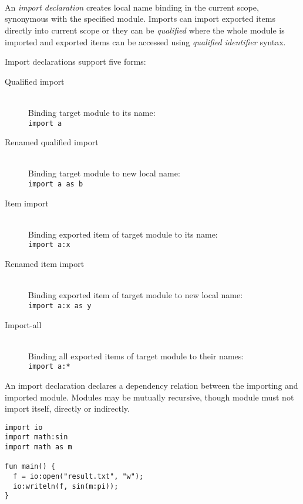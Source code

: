 \begin{bnf}
   \eq {} \  \\
  \\
   \eq    {} 
                  \gorln {} \  \  
                  \gorln {} \ \term{:} \  
                  \gorln {} \ \term{:} \  \  \  
                  \gorln {} \ \term{:} \ \term{*} 
\end{bnf}

An \emph{import declaration} creates local name binding in the current scope, synonymous with the specified module. Imports can import exported items directly into current scope or they can be \emph{qualified} where the whole module is imported and exported items can be accessed using \emph{qualified identifier} syntax.

Import declarations support five forms:

\begin{description}
  \item [Qualified import] \hfill \\
    Binding target module to its name: \\
    \lstinline{import a}
  \item [Renamed qualified import] \hfill \\
    Binding target module to new local name: \\
    \lstinline{import a as b}
  \item [Item import] \hfill \\
    Binding exported item of target module to its name: \\
    \lstinline{import a:x}
  \item [Renamed item import] \hfill \\
    Binding exported item of target module to new local name: \\
    \lstinline{import a:x as y}
  \item [Import-all] \hfill \\
    Binding all exported items of target module to their names: \\
    \lstinline{import a:*}
\end{description}

An import declaration declares a dependency relation between the importing and imported module. Modules may be mutually recursive, though module must not import itself, directly or indirectly.

\begin{example}
\begin{lstlisting}
import io
import math:sin
import math as m

fun main() {
  f = io:open("result.txt", "w");
  io:writeln(f, sin(m:pi));
}
\end{lstlisting}
\end{example}

